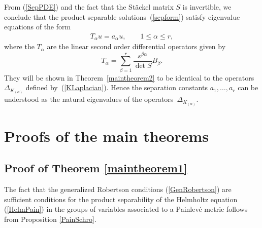 \documentclass[pdftex]{sigma}
\numberwithin{equation}{section}
\begin{document}
\begin{Remark} From (\ref{SepPDE}) and the fact that the St\"ackel matrix $S$ is invertible, we conclude that the product separable solutions~(\ref{sepform}) satisfy eigenvalue equations of the form
\begin{gather}\label{eigenvalueeq}
T_{\alpha} u = a_{\alpha}u, \qquad 1\leq \alpha \leq r,
\end{gather}
where the $T_{\alpha}$ are the linear second order differential operators given by
\[
 T_{\alpha} = \sum_{\beta = 1}^r \frac{s^{\beta \alpha}}{\det S} B_\beta.
\]
They will be shown in Theorem~\ref{maintheorem2} to be identical to the operators $\Delta_{K_{(\alpha)}}$ defined by~(\ref{KLaplacian}). Hence the separation constants $a_1, \dots, a_r$ can be understood as the natural eigenvalues of the operators~$\Delta_{K_{(\alpha)}}$.
\end{Remark}


\section{Proofs of the main theorems} \label{ProofsofMainTheorems}

\subsection{Proof of Theorem \ref{maintheorem1}}
The fact that the generalized Robertson conditions (\ref{GenRobertson}) are sufficient conditions for the product separability of the Helmholtz equation (\ref{HelmPain}) in the groups of variables associated to a Painlev\'e metric follows from Proposition \ref{PainSchro}.
\end{document}
